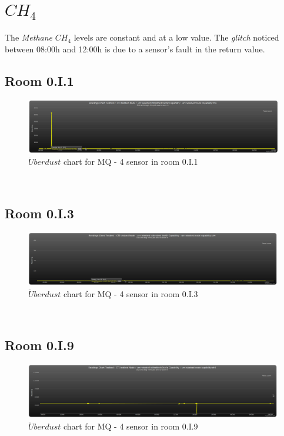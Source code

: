 \documentclass[12pt,a4paper]{report}
\begin{document}
\section{$CH_4$}
%
The \textit{Methane} $CH_4$ levels are constant and at a low value.
The \textit{glitch} noticed between 08:00h and 12:00h is due to a sensor's fault in the return value.
\subsection{Room 0.I.1}
%
\begin{figure}[H]
\centering
	\includegraphics*[width=\textwidth]{ch4_1}
	\caption{$\ddot{U}berdust$ chart for MQ - 4 sensor in room 0.I.1}
	\label{chart_ch4_1}
\end{figure}
\ \\
%
\subsection{Room 0.I.3}
%
\begin{figure}[H]
\centering
	\includegraphics*[width=\textwidth]{ch4_3}
	\caption{$\ddot{U}berdust$ chart for MQ - 4 sensor in room 0.I.3}
	\label{chart_ch4_3}
\end{figure}
\ \\
%
\subsection{Room 0.I.9}
%
\begin{figure}[H]
\centering
	\includegraphics*[width=\textwidth]{ch4_9}
	\caption{$\ddot{U}berdust$ chart for MQ - 4 sensor in room 0.I.9}
	\label{chart_ch4_9}
\end{figure}
\ \\
%
\end{document}
